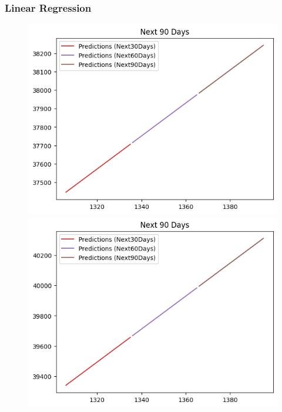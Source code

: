 \subsubsection{Linear Regression}
\begin{figure}[H]
    \centering
    \begin{minipage}{0.15\textwidth}
    \centering
    \includegraphics[width=1\textwidth]{resources/chapter-5/newdata1/predicted/BIDV_LinearRegression_7-3_90Days.png}
    \end{minipage}
    \hfill
    \begin{minipage}{0.15\textwidth}
    \centering
    \includegraphics[width=1\textwidth]{resources/chapter-5/newdata1/predicted/BIDV_LinearRegression_8-2_90Days.png}

\end{minipage}
\end{figure}
